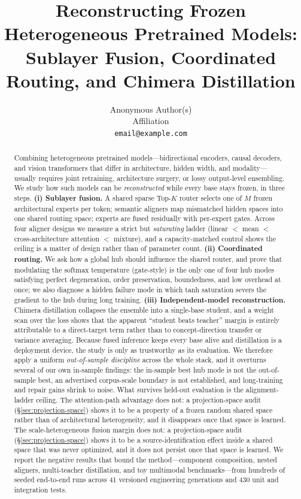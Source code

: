 \documentclass[10pt,twoside]{article}
\title{Reconstructing Frozen Heterogeneous Pretrained Models:\\
Sublayer Fusion, Coordinated Routing, and Chimera Distillation}
\author{
    Anonymous Author(s)\\
    Affiliation\\
    \texttt{email@example.com}
}
\theoremstyle{definition}
\theoremstyle{plain}
\theoremstyle{remark}
\begin{document}
\maketitle

\begin{abstract}
Combining heterogeneous pretrained models---bidirectional encoders, causal decoders, and vision transformers that differ in architecture, hidden width, and modality---usually requires joint retraining, architecture surgery, or lossy output-level ensembling. We study how such models can be \emph{reconstructed} while every base stays frozen, in three steps. \textbf{(i) Sublayer fusion.} A shared sparse Top-$K$ router selects one of $M$ frozen architectural experts per token; semantic aligners map mismatched hidden spaces into one shared routing space; experts are fused residually with per-expert gates. Across four aligner designs we measure a strict but \emph{saturating} ladder (linear $<$ mean $<$ cross-architecture attention $<$ mixture), and a capacity-matched control shows the ceiling is a matter of design rather than of parameter count. \textbf{(ii) Coordinated routing.} We ask how a global hub should influence the shared router, and prove that modulating the softmax temperature (gate-style) is the only one of four hub modes satisfying perfect degeneration, order preservation, boundedness, and low overhead at once; we also diagnose a hidden failure mode in which tanh saturation severs the gradient to the hub during long training. \textbf{(iii) Independent-model reconstruction.} Chimera distillation collapses the ensemble into a single-base student, and a weight scan over the loss shows that the apparent ``student beats teacher'' margin is entirely attributable to a direct-target term rather than to concept-direction transfer or variance averaging. Because fused inference keeps every base alive and distillation is a deployment device, the study is only as trustworthy as its evaluation. We therefore apply a uniform \emph{out-of-sample discipline} across the whole stack, and it overturns several of our own in-sample findings: the in-sample best hub mode is not the out-of-sample best, an advertised corpus-scale boundary is not established, and long-training and repair gains shrink to noise. What survives held-out evaluation is the alignment-ladder ceiling. The attention-path advantage does not: a projection-space audit (\S\ref{sec:projection-space}) shows it to be a property of a frozen random shared space rather than of architectural heterogeneity, and it disappears once that space is learned. The scale-heterogeneous fusion margin does not: a projection-space audit (\S\ref{sec:projection-space}) shows it to be a source-identification effect inside a shared space that was never optimized, and it does not persist once that space is learned. We report the negative results that bound the method---component composition, nested aligners, multi-teacher distillation, and toy multimodal benchmarks---from hundreds of seeded end-to-end runs across 41 versioned engineering generations and 430 unit and integration tests.
\end{abstract}
\end{document}
